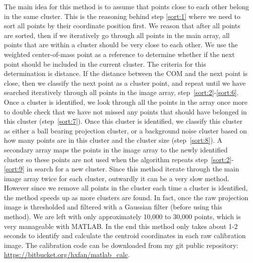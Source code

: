 The main idea for this method is to assume that points close to each other belong in the same cluster.  This is the reasoning behind step \ref{sort:1} where we need to sort all points by their coordinate position first.  We reason that after all points are sorted, then if we iteratively go through all points in the main array, all points that are within a cluster should be very close to each other.  We use the weighted center-of-mass point as a reference to determine whether if the next point should be included in the current cluster.  The criteria for this determination is distance.  If the distance between the COM and the next point is close, then we classify the next point as a cluster point, and repeat until we have searched iteratively through all points in the image array, step~\ref{sort:2}-\ref{sort:6}.  Once a cluster is identified, we look through all the points in the array once more to double check that we have not missed any points that should have belonged in this cluster (step~\ref{sort:7}).  Once this cluster is identified, we classify this cluster as either a ball bearing projection cluster, or a background noise cluster based on how many points are in this cluster and the cluster size (step~\ref{sort:8}).  A secondary array maps the points in the image array to the newly identified cluster so these points are not used when the algorithm repeats step~\ref{sort:2}-\ref{sort:9} in search for a new cluster.  Since this method iterate through the main image array twice for each cluster, outwardly it can be a very slow method.  However since we remove all points in the cluster each time a cluster is identified, the method speeds up as more clusters are found.  In fact, once the raw projection image is thresholded and filtered with a Gaussian filter (before using this method).  We are left with only approximately 10,000 to 30,000 points, which is very manageable with MATLAB.  In the end this method only takes about 1-2 seconds to identify and calculate the centroid coordinates in each raw calibration image.  The calibration code can be downloaded from my git public repository: \url{https://bitbucket.org/hxfan/matlab_calc}.

